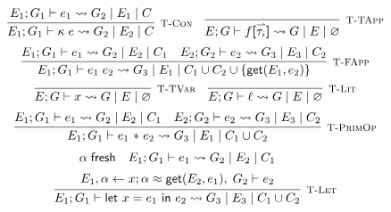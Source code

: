 \begin{figure}[]
    \centering
    \[
        \infer[\textsc{\footnotesize T-Con}]{
            E_1; G_1 \vdash \kappa\; e
                \rightsquigarrow G_2\; |\; E_2\; |\; C
        }{
            E_1; G_1 \vdash e_1 \rightsquigarrow G_2\; |\; E_1\; |\; C
        }
        \hspace{1em}
        \infer[\textsc{\footnotesize T-TApp}]{
            E; G \vdash f\textbf{[}\harpoon{\tau_i}\textbf{]}
                \rightsquigarrow G\; |\; E\; |\; \varnothing
        }{
        }
    \]
    \vspace{0.5pt}
    \[
        \infer[\textsc{\footnotesize T-FApp}]{
            E_1; G_1 \vdash e_1\; e_2
                \rightsquigarrow G_3\; |\; E_1\; |\; C_1 \cup C_2 
                \cup \{\textsf{get}(E_1,e_2)\}
        }{
            E_1; G_1 \vdash e_1 \rightsquigarrow G_2\; |\; E_2\; |\; C_1
            \hspace{1em}
            E_2; G_2 \vdash e_2 \rightsquigarrow G_3\; |\; E_3\; |\; C_2
        }
    \]
    \vspace{0.5pt}
    \[
        \infer[\textsc{\footnotesize T-TVar}]{
            E; G \vdash x
                \rightsquigarrow G\; |\; E\; |\; \varnothing
        }{}
        \hspace{1em}
        \infer[\textsc{\footnotesize T-Lit}]{
            E; G \vdash \ell
                \rightsquigarrow G\; |\; E\; |\; \varnothing
        }{}
    \]
    \vspace{0.5pt}
    \[
        \infer[\textsc{\footnotesize T-PrimOp}]{
            E_1; G_1 \vdash e_1 \text{ \textasteriskcentered }\; e_2
                \rightsquigarrow G_3\; |\; E_1\; |\; C_1 \cup C_2
        }{
            E_1; G_1 \vdash e_1 \rightsquigarrow G_2\; |\; E_2\; |\; C_1
            \hspace{1em}
            E_2; G_2 \vdash e_2 \rightsquigarrow G_3\; |\; E_3\; |\; C_2
        }
    \]
    \vspace{0.5pt}
    \[
        \infer[\textsc{\footnotesize T-Let}]{
            E_1; G_1 \vdash \textsf{let } x = e_1 \textsf{ in } e_2
                \rightsquigarrow G_3\; |\; E_3\; |\; C_1 \cup C_2
        }{
            \begin{array}{c}
                \alpha \; \textsf{fresh}
                \hspace{1em}
                E_1; G_1 \vdash e_1 \rightsquigarrow G_2\; |\; E_2\; |\; C_1 \\[5pt]
                E_1, \alpha \leftarrow x; \alpha \teq \textsf{get}(E_2, e_1),\; G_2 \vdash e_2 

\end{array}}\]
\end{figure}
